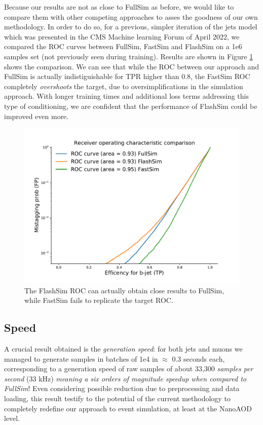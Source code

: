 Because our results are not as close to FullSim as before, we would like to compare them with other competing approaches to asses the goodness of our own methodology. In order to do so, for a previous, simpler iteration of the jets model which was presented in the CMS Machine learning Forum of April 2022, we compared the ROC curves between FullSim, FastSim and FlashSim on a 1e6 samples set (not previously seen during training). Results are shown in Figure \ref{fig:allrocs} shows the comparison. We can see that while the ROC between our approach and FullSim is actually indistiguishable for TPR higher than 0.8, the FastSim ROC completely \emph{overshoots} the target, due to oversimplifications in the simulation approach. With longer training times and additional loss terms addressing this type of conditioning, we are confident that the performance of FlashSim could be improved even more.

\begin{figure}
    \centering
    \includegraphics[width=\linewidth]{gfx/ch5/allrocs.pdf}
    \caption[ROC Comparison]{The FlashSim ROC can actually obtain close results to FullSim, while FastSim fails to replicate the target ROC.}
    \label{fig:allrocs}
\end{figure}


\subsection{Speed}

A crucial result obtained is the \emph{generation speed}: for both jets and muons we managed to generate samples in batches of 1e4 in $\approx$ 0.3 seconds each, corresponding to a generation speed of raw samples of about 33,300 \emph{samples per second} (33 kHz) \emph{meaning a six orders of magnitude speedup when compared to FullSim}! Even considering possible reduction due to preprocessing and data loading, this result testify to the potential of the current methodology to completely redefine our approach to event simulation, at least at the NanoAOD level.

